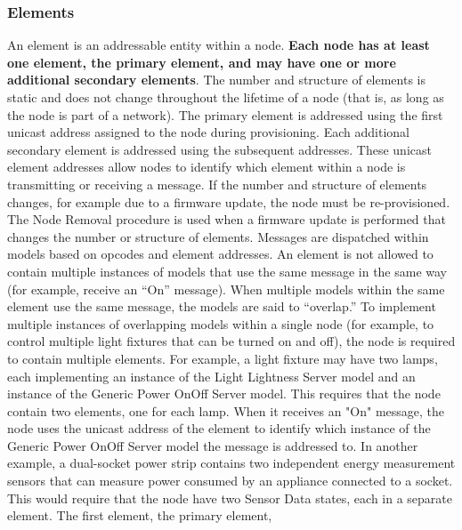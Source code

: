 \documentclass[\main/main.tex]{subfiles}
\begin{document}
\subsubsection{Elements}
An element is an addressable entity within a node. \textbf{Each node has at least one element, the primary element, and may have one or more additional secondary elements}. The number and structure of elements is static and does not change throughout the lifetime of a node (that is, as long as the node is part of a network).
\newline\newline
The primary element is addressed using the first unicast address assigned to the node during provisioning. Each additional secondary element is addressed using the subsequent addresses. These unicast element addresses allow nodes to identify which element within a node is transmitting or receiving a message.
\newline\newline
If the number and structure of elements changes, for example due to a firmware update, the node must be re-provisioned. The Node Removal procedure is used when a firmware update is performed that changes the number or structure of elements.
\newline\newline
Messages are dispatched within models based on opcodes and element addresses.
\newline\newline
An element is not allowed to contain multiple instances of models that use the same message in the same way (for example, receive an “On” message). When multiple models within the same element use the same message, the models are said to “overlap.” To implement multiple instances of overlapping models within a single node (for example, to control multiple light fixtures that can be turned on and off), the node is required to contain multiple elements.
\newline\newline
For example, a light fixture may have two lamps, each implementing an instance of the Light Lightness Server model and an instance of the Generic Power OnOff Server model. This requires that the node contain two elements, one for each lamp. When it receives an "On" message, the node uses the unicast
address of the element to identify which instance of the Generic Power OnOff Server model the message is addressed to.
\newline\newline
In another example, a dual-socket power strip contains two independent energy measurement sensors that can measure power consumed by an appliance connected to a socket. This would require that the node have two Sensor Data states, each in a separate element. The first element, the primary element,
\end{document}

